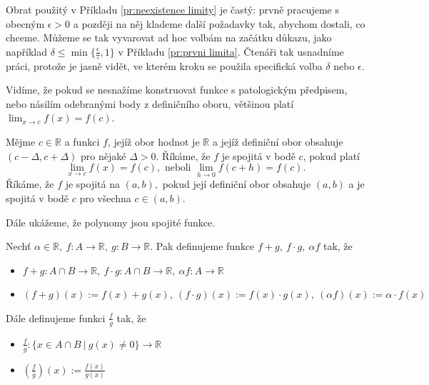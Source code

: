 \begin{poznámka}
	Obrat použitý v Příkladu \ref{pr:neexistence limity} je častý: prvně pracujeme s obecným $\epsilon>0$ a později na něj klademe další požadavky tak, abychom dostali, co chceme. Můžeme se tak vyvarovat ad hoc volbám na začátku důkazu, jako například $\delta\leq \min\{\frac{\epsilon}{7},1\}$ v Příkladu \ref{pr:prvni limita}. Čtenáři tak usnadníme práci, protože je jasně vidět, ve kterém kroku se použila specifická volba $\delta$ nebo $\epsilon$.
\end{poznámka}

Vidíme, že pokud se nesnažíme konstruovat funkce s patologickým předpisem, nebo násilím odebranými body z definičního oboru, většinou platí $\lim_{x\to c}f(x)=f(c).$

\begin{definice}
  Mějme $c\in \mathbb{R}$ a funkci $f$, jejíž obor hodnot je $\mathbb{R}$ a jejíž definiční obor obsahuje $(c-\Delta,c+\Delta)$ pro nějaké $\Delta>0.$ Říkáme, že $f$ je spojitá v bodě $c$, pokud platí
  \begin{equation*}
	  \lim_{x\to c}f(x)=f(c), \text{ neboli } \lim_{h\to 0}f(c+h)=f(c).
  \end{equation*}
  Říkáme, že $f$ je spojitá na $(a,b),$ pokud její definiční obor obsahuje $(a,b)$ a je spojitá v bodě $c$ pro všechna $c\in (a,b).$
\end{definice}

Dále ukážeme, že polynomy jsou spojité funkce.

\begin{definice}
  Nechť $\alpha\in \mathbb{R},\ f\colon A\to \mathbb{R},\ g\colon B\to \mathbb{R}.$ Pak definujeme funkce $f+g,\ f\cdot g,\ \alpha f$ tak, že
  \begin{itemize}
	  \item $f+g\colon A\cap B\to \mathbb{R},\ f\cdot g\colon A\cap B\to \mathbb{R},\ \alpha f\colon A\to \mathbb{R}$
	  \item $(f+g)(x):= f(x)+g(x),\ (f\cdot g)(x):= f(x)\cdot g(x),\ (\alpha f)(x):= \alpha\cdot f(x)$
  \end{itemize}
  Dále definujeme funkci $\frac{f}{g}$ tak, že
  \begin{itemize}
	  \item $\frac{f}{g}:\{x\in A\cap B\ \rvert\  g(x)\neq 0\}\to \mathbb{R}$
	  \item $\left(\frac{f}{g}\right)(x):= \frac{f(x)}{g(x)}$
  \end{itemize}
\end{definice}

